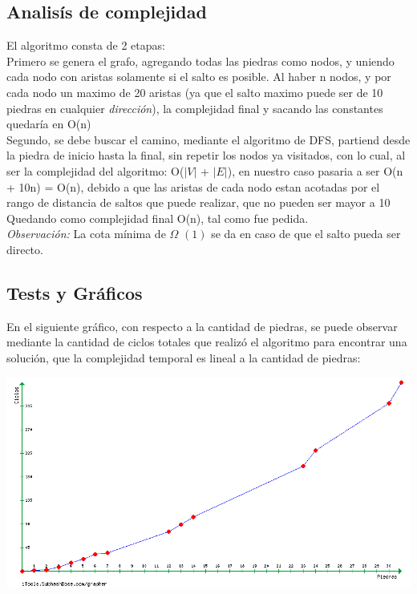 \subsection{Analisís de complejidad}	
El algoritmo consta de 2 etapas:\\ 


Primero se genera el grafo, agregando todas las piedras como nodos, y uniendo cada nodo con aristas solamente si el salto es posible. Al haber n nodos, y por cada nodo un maximo de 20 aristas (ya que el salto maximo puede ser de 10 piedras en cualquier \textit{dirección}), la complejidad final y sacando las constantes quedaría en O(n)\\  
Segundo, se debe buscar el camino, mediante  el algoritmo de DFS, partiend desde la piedra de inicio hasta la final, sin repetir los nodos ya visitados, con lo cual, al ser la complejidad del algoritmo: O($|V|$ + $|E|$), en nuestro caso pasaria a ser O(n + 10n) = O(n), debido a que las aristas de cada nodo estan acotadas por el rango de distancia de saltos que puede realizar, que no pueden ser mayor a 10\\  
Quedando como complejidad final O(n), tal como fue pedida. \\
\textit{Observación:} La cota mínima de $\Omega$ $(1)$ se da en caso de que el salto pueda ser directo.

\subsection{Tests y Gráficos}
En el siguiente gráfico, con respecto a la cantidad de piedras, se puede observar mediante la cantidad de ciclos totales que realizó el algoritmo para encontrar una solución, que la complejidad temporal es lineal a la cantidad de piedras:
\begin {center}
\includegraphics[width=15cm]{./graficos/grafico_ej3_0.png}
\end {center} 

